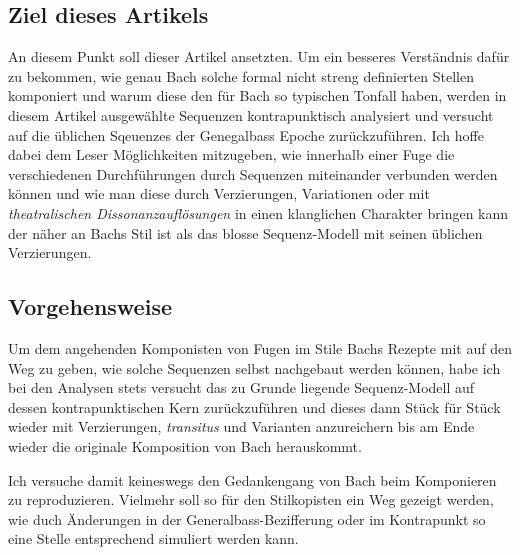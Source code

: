 \subsection{Ziel dieses Artikels}

An diesem Punkt soll dieser Artikel ansetzten.
Um ein besseres Verständnis dafür zu bekommen, wie genau Bach solche formal nicht streng definierten Stellen komponiert und warum diese den für Bach so typischen Tonfall haben, werden in diesem Artikel ausgewählte Sequenzen kontrapunktisch analysiert und versucht auf die üblichen Sqeuenzes der Genegalbass Epoche zurückzuführen.
Ich hoffe dabei dem Leser Möglichkeiten mitzugeben, wie innerhalb einer Fuge die verschiedenen Durchführungen durch Sequenzen miteinander verbunden werden können und wie man diese durch Verzierungen, Variationen oder mit \emph{theatralischen Dissonanzauflösungen}\autocite[208-219]{heinichen:general-bass,menke:kontrapunkt2} in einen klanglichen Charakter bringen kann der näher an Bachs Stil ist als das blosse Sequenz-Modell mit seinen üblichen Verzierungen.


\subsection{Vorgehensweise}

Um dem angehenden Komponisten von Fugen im Stile Bachs Rezepte mit auf den Weg zu geben, wie solche Sequenzen selbst nachgebaut werden können, habe ich bei den Analysen stets versucht das zu Grunde liegende Sequenz-Modell auf dessen kontrapunktischen Kern zurückzuführen und dieses dann Stück für Stück wieder mit Verzierungen, \emph{transitus } und Varianten anzureichern bis am Ende wieder die originale Komposition von Bach herauskommt.

Ich versuche damit keineswegs den Gedankengang von Bach beim Komponieren zu reproduzieren.
Vielmehr soll so für den Stilkopisten ein Weg gezeigt werden, wie duch Änderungen in der Generalbass-Bezifferung oder im Kontrapunkt so eine Stelle entsprechend simuliert werden kann.
